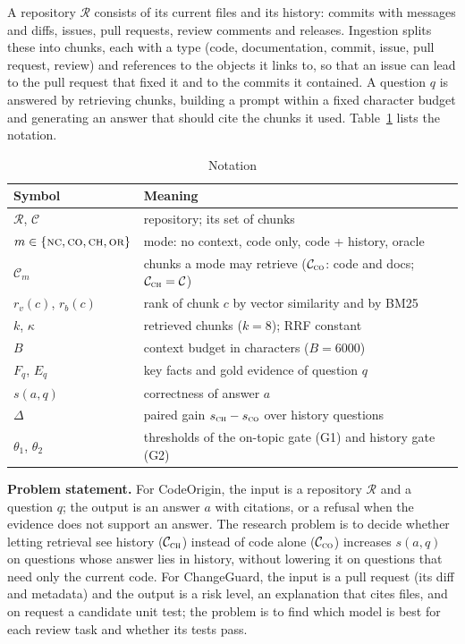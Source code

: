 \documentclass[12pt,onecolumn,draftclsnofoot]{IEEEtran}
\begin{document}
A repository $\mathcal{R}$ consists of its current files and its history: commits with messages and diffs, issues, pull requests, review comments and releases. Ingestion splits these into chunks, each with a type (code, documentation, commit, issue, pull request, review) and references to the objects it links to, so that an issue can lead to the pull request that fixed it and to the commits it contained. A question $q$ is answered by retrieving chunks, building a prompt within a fixed character budget and generating an answer that should cite the chunks it used. Table~\ref{tab:notation} lists the notation.

\begin{table}[!t]
\caption{Notation}
\label{tab:notation}
\centering
\small
\begin{tabular}{@{}ll@{}}
\toprule
Symbol & Meaning \\
\midrule
$\mathcal{R}$, $\mathcal{C}$ & repository; its set of chunks \\
$m \in \{\textsc{nc},\textsc{co},\textsc{ch},\textsc{or}\}$ & mode: no context, code only, code + history, oracle \\
$\mathcal{C}_m$ & chunks a mode may retrieve ($\mathcal{C}_{\textsc{co}}$: code and docs; $\mathcal{C}_{\textsc{ch}}=\mathcal{C}$) \\
$r_v(c)$, $r_b(c)$ & rank of chunk $c$ by vector similarity and by BM25 \\
$k$, $\kappa$ & retrieved chunks ($k=8$); RRF constant \\
$B$ & context budget in characters ($B=6000$) \\
$F_q$, $E_q$ & key facts and gold evidence of question $q$ \\
$s(a,q)$ & correctness of answer $a$ \\
$\Delta$ & paired gain $s_{\textsc{ch}}-s_{\textsc{co}}$ over history questions \\
$\theta_1$, $\theta_2$ & thresholds of the on-topic gate (G1) and history gate (G2) \\
\bottomrule
\end{tabular}
\end{table}

\textbf{Problem statement.} For CodeOrigin, the input is a repository $\mathcal{R}$ and a question $q$; the output is an answer $a$ with citations, or a refusal when the evidence does not support an answer. The research problem is to decide whether letting retrieval see history ($\mathcal{C}_{\textsc{ch}}$) instead of code alone ($\mathcal{C}_{\textsc{co}}$) increases $s(a,q)$ on questions whose answer lies in history, without lowering it on questions that need only the current code. For ChangeGuard, the input is a pull request (its diff and metadata) and the output is a risk level, an explanation that cites files, and on request a candidate unit test; the problem is to find which model is best for each review task and whether its tests pass.
\end{document}
